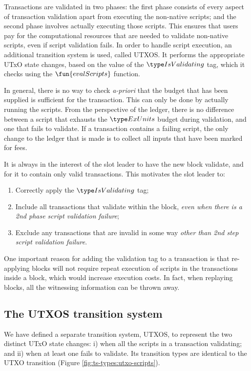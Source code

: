 Transactions are validated in two phases:
the first phase consists of every aspect of transaction validation apart from executing the non-native scripts; and
the second phase involves actually executing those scripts.
This ensures that users pay for the computational resources that are needed to validate non-native scripts, even
if script validation fails. %
In order to handle script execution, an additional transition system is used, called UTXOS.
It performs the appropriate UTxO state changes, based on the
value of the $\IsValidating$ tag, which it checks using the $\fun{evalScripts}$ function.

In general, there is no way to check \emph{a-priori} that the budget that has been supplied is sufficient for the transaction.
This can only be done by actually running the scripts. From the perspective of the ledger, there is no difference
between a script that exhausts the $\ExUnits$ budget during validation, and one that fails to validate.
If a transaction contains a failing script, the only change to the ledger that is made
is to collect all inputs that have been marked for fees.

It is always in the interest of the slot leader to have the new block validate,
and for it to contain only valid transactions. This motivates the
slot leader to:

\begin{enumerate}
  \item Correctly apply the $\IsValidating$ tag;
  \item Include all transactions that validate within the block,
  \textit{even when there is a 2nd phase script validation failure};
  \item Exclude any transactions that are invalid in some way \textit{other than 2nd step script validation failure}.
\end{enumerate}

One important reason for adding the validation tag
to a transaction is that re-applying blocks will not require repeat
execution of scripts in the transactions inside a block, which would increase execution costs.
In fact, when replaying
blocks, all the witnessing information can be thrown away.

\subsection{The UTXOS transition system}
\label{sec:utxo-state-trans}

We have defined a separate transition system, UTXOS, to represent the two distinct
UTxO state changes: i) when all the scripts in a transaction validating; and
ii) when at least one fails to validate. Its transition types
are identical to the UTXO transition (Figure
\ref{fig:ts-types:utxo-scripts}).

